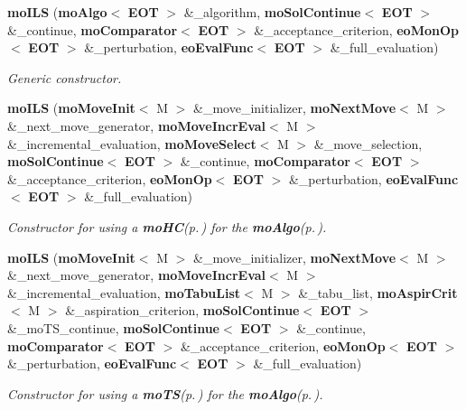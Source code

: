 \begin{CompactItemize}
\item 
{\bf mo\-ILS} ({\bf mo\-Algo}$<$ {\bf EOT} $>$ \&\_\-algorithm, {\bf mo\-Sol\-Continue}$<$ {\bf EOT} $>$ \&\_\-continue, {\bf mo\-Comparator}$<$ {\bf EOT} $>$ \&\_\-acceptance\_\-criterion, {\bf eo\-Mon\-Op}$<$ {\bf EOT} $>$ \&\_\-perturbation, {\bf eo\-Eval\-Func}$<$ {\bf EOT} $>$ \&\_\-full\_\-evaluation)
\begin{CompactList}\small\item\em Generic constructor. \item\end{CompactList}\item 
{\bf mo\-ILS} ({\bf mo\-Move\-Init}$<$ M $>$ \&\_\-move\_\-initializer, {\bf mo\-Next\-Move}$<$ M $>$ \&\_\-next\_\-move\_\-generator, {\bf mo\-Move\-Incr\-Eval}$<$ M $>$ \&\_\-incremental\_\-evaluation, {\bf mo\-Move\-Select}$<$ M $>$ \&\_\-move\_\-selection, {\bf mo\-Sol\-Continue}$<$ {\bf EOT} $>$ \&\_\-continue, {\bf mo\-Comparator}$<$ {\bf EOT} $>$ \&\_\-acceptance\_\-criterion, {\bf eo\-Mon\-Op}$<$ {\bf EOT} $>$ \&\_\-perturbation, {\bf eo\-Eval\-Func}$<$ {\bf EOT} $>$ \&\_\-full\_\-evaluation)
\begin{CompactList}\small\item\em Constructor for using a {\bf mo\-HC}{\rm (p.\,\pageref{classmo_h_c})} for the {\bf mo\-Algo}{\rm (p.\,\pageref{classmo_algo})}. \item\end{CompactList}\item 
{\bf mo\-ILS} ({\bf mo\-Move\-Init}$<$ M $>$ \&\_\-move\_\-initializer, {\bf mo\-Next\-Move}$<$ M $>$ \&\_\-next\_\-move\_\-generator, {\bf mo\-Move\-Incr\-Eval}$<$ M $>$ \&\_\-incremental\_\-evaluation, {\bf mo\-Tabu\-List}$<$ M $>$ \&\_\-tabu\_\-list, {\bf mo\-Aspir\-Crit}$<$ M $>$ \&\_\-aspiration\_\-criterion, {\bf mo\-Sol\-Continue}$<$ {\bf EOT} $>$ \&\_\-mo\-TS\_\-continue, {\bf mo\-Sol\-Continue}$<$ {\bf EOT} $>$ \&\_\-continue, {\bf mo\-Comparator}$<$ {\bf EOT} $>$ \&\_\-acceptance\_\-criterion, {\bf eo\-Mon\-Op}$<$ {\bf EOT} $>$ \&\_\-perturbation, {\bf eo\-Eval\-Func}$<$ {\bf EOT} $>$ \&\_\-full\_\-evaluation)
\begin{CompactList}\small\item\em Constructor for using a {\bf mo\-TS}{\rm (p.\,\pageref{classmo_t_s})} for the {\bf mo\-Algo}{\rm (p.\,\pageref{classmo_algo})}. \item\end{CompactList}\item 

\end{CompactItemize}
